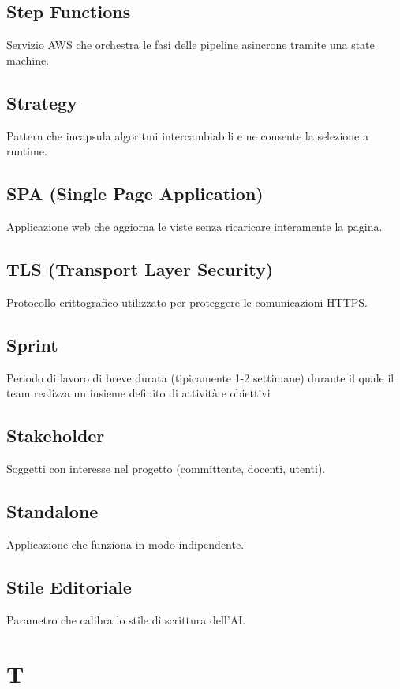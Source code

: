 \documentclass[a4paper,12pt]{article}
\begin{document}
\subsection{Step Functions}
Servizio AWS che orchestra le fasi delle pipeline asincrone tramite una state machine.

\subsection{Strategy}
Pattern che incapsula algoritmi intercambiabili e ne consente la selezione a runtime.

\subsection{SPA (Single Page Application)}
Applicazione web che aggiorna le viste senza ricaricare interamente la pagina.

\subsection{TLS (Transport Layer Security)}
Protocollo crittografico utilizzato per proteggere le comunicazioni HTTPS.

\subsection{Sprint}
Periodo di lavoro di breve durata (tipicamente 1-2 settimane) durante il quale il team realizza un insieme definito di attività e obiettivi

\subsection{Stakeholder}
Soggetti con interesse nel progetto (committente, docenti, utenti).

\subsection{Standalone}
Applicazione che funziona in modo indipendente.

\subsection{Stile Editoriale}
Parametro che calibra lo stile di scrittura dell'AI.

\section{T}
\end{document}
